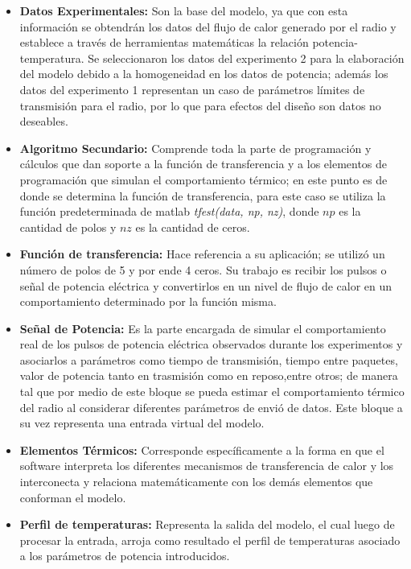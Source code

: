  \begin{itemize}
     \item \textbf{Datos Experimentales:} Son la base del modelo, ya que con esta información se obtendrán los datos del flujo de calor generado por el radio y establece a través de herramientas matemáticas la relación potencia-temperatura. Se seleccionaron los datos del experimento 2 para la elaboración del modelo debido a la homogeneidad en los datos de potencia; además los datos del experimento 1 representan un caso de parámetros límites de transmisión para el radio, por lo que para efectos del diseño son datos no deseables.
     \item \textbf{Algoritmo Secundario:} Comprende toda la parte de programación y cálculos que dan soporte a la función de transferencia y a los elementos de programación que simulan el comportamiento térmico; en este punto es de donde se determina la función de transferencia, para este caso se utiliza la función predeterminada de matlab \textit{tfest(data, np, nz)}, donde $np$ es la cantidad de polos y $nz$ es la cantidad de ceros.
     \item \textbf{Función de transferencia:} Hace referencia a su aplicación; se utilizó un número de polos de 5 y por ende 4 ceros. Su trabajo  es recibir los pulsos o señal de potencia eléctrica y convertirlos en un nivel de flujo de calor en un comportamiento determinado por la función misma.
     \item \textbf{Señal de Potencia:} Es la parte encargada de simular el comportamiento real de los pulsos de potencia eléctrica observados durante los experimentos y asociarlos a parámetros como tiempo de transmisión, tiempo entre paquetes, valor de potencia tanto en trasmisión como en reposo,entre otros; de manera tal que por medio de este bloque se pueda estimar el comportamiento térmico del radio al considerar diferentes parámetros de envió de datos. Este bloque a su vez representa una entrada virtual del modelo.
     \item \textbf{Elementos Térmicos:} Corresponde específicamente a la forma en que el software interpreta los diferentes mecanismos de transferencia de calor y los interconecta y relaciona matemáticamente con los demás elementos que conforman el modelo. 
     \item \textbf{Perfil de temperaturas:} Representa la salida del modelo, el cual luego de procesar la entrada, arroja como resultado el perfil de temperaturas asociado a los parámetros de potencia introducidos.
 \end{itemize}
 
